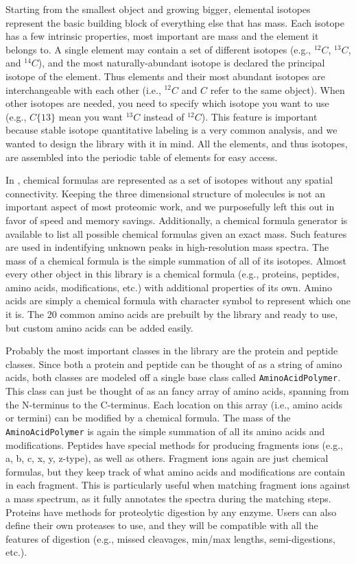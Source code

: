 Starting from the smallest object and growing bigger, elemental isotopes represent the basic building block of everything else that has mass. Each isotope has a few intrinsic properties, most important are mass and the element it belongs to. A single element may contain a set of different isotopes (e.g., $^{12}C$, $^{13}C$, and $^{14}C$), and the most naturally-abundant isotope is declared the principal isotope of the element. Thus elements and their most abundant isotopes are interchangeable with each other (i.e., $^{12}C$ and $C$ refer to the same object). When other isotopes are needed, you need to specify which isotope you want to use (e.g., $C\{13\}$ mean you want $^{13}C$ instead of $^{12}C$). This feature is important because stable isotope quantitative labeling is a very common analysis, and we wanted to design the library with it in mind. All the elements, and thus isotopes, are assembled into the periodic table of elements for easy access.

In \csmsl{}, chemical formulas are represented as a set of isotopes without any spatial connectivity. Keeping the three dimensional structure of molecules is not an important aspect of most proteomic work, and we purposefully left this out in favor of speed and memory savings. Additionally, a chemical formula generator is available to list all possible chemical formulas given an exact mass. Such features are used in indentifying unknown peaks in high-resolution mass spectra. The mass of a chemical formula is the simple summation of all of its isotopes. Almost every other object in this library is a chemical formula (e.g., proteins, peptides, amino acids, modifications, etc.)  with additional properties of its own. Amino acids are simply a chemical formula with character symbol to represent which one it is. The 20 common amino acids are prebuilt by the library and ready to use, but custom amino acids can be added easily.

Probably the most important classes in the library are the protein and peptide classes. Since both a protein and peptide can be thought of as a string of amino acids, both classes are modeled off a single base class called \texttt{AminoAcidPolymer}. This class can just be thought of as an fancy array of amino acids, spanning from the N-terminus to the C-terminus. Each location on this array (i.e., amino acids or termini) can be modified by a chemical formula. The mass of the \texttt{AminoAcidPolymer} is again the simple summation of all its amino acids and modifications. Peptides have special methods for producing fragments ions (e.g., a, b, c, x, y, z-type), as well as others. Fragment ions again are just chemical formulas, but they keep track of what amino acids and modifications are contain in each fragment. This is particularly useful when matching fragment ions against a mass spectrum, as it fully annotates the spectra during the matching steps. Proteins have methods for proteolytic digestion by any enzyme. Users can also define their own proteases to use, and they will be compatible with all the features of digestion (e.g., missed cleavages, min/max lengths, semi-digestions, etc.).

